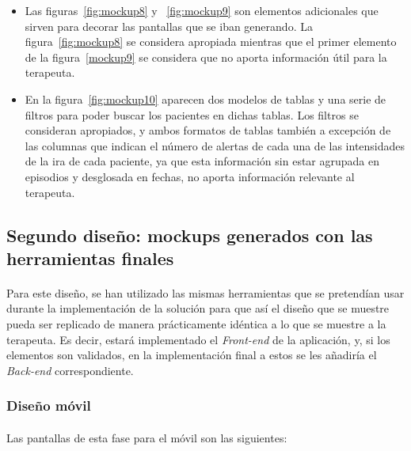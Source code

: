 \begin{itemize}
    \item Las figuras~\ref{fig:mockup8} y ~\ref{fig:mockup9} son elementos adicionales que sirven para decorar las pantallas que se iban generando. La figura~\ref{fig:mockup8} se considera apropiada mientras que el primer elemento de la figura~\ref{mockup9} se considera que no aporta información útil para la terapeuta.
    \item En la figura~\ref{fig:mockup10} aparecen dos modelos de tablas y una serie de filtros para poder buscar los pacientes en dichas tablas. Los filtros se consideran apropiados, y ambos formatos de tablas también a excepción de las columnas que indican el número de alertas de cada una de las intensidades de la ira de cada paciente, ya que esta información sin estar agrupada en episodios y desglosada en fechas, no aporta información relevante al terapeuta.
\end{itemize}

\subsection{Segundo diseño: mockups generados con las herramientas finales}
\paragraph{}
Para este diseño, se han utilizado las mismas herramientas que se pretendían usar durante la implementación de la solución para que así el diseño que se muestre pueda ser replicado de manera prácticamente idéntica a lo que se muestre a la terapeuta. Es decir, estará implementado el \textit{Front-end} de la aplicación, y, si los elementos son validados, en la implementación final a estos se les añadiría el \textit{Back-end} correspondiente.

\subsubsection{Diseño móvil}

\paragraph{}
Las pantallas de esta fase para el móvil son las siguientes:

